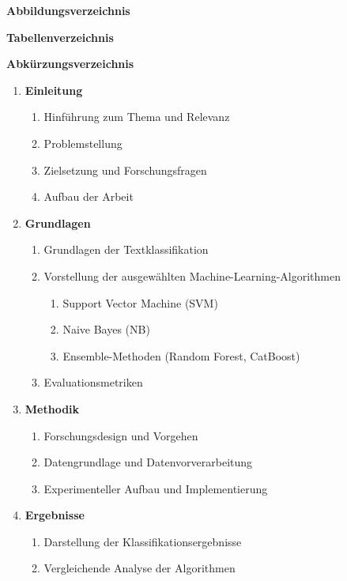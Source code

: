 \noindent\textbf{Abbildungsverzeichnis}
\par\noindent\textbf{Tabellenverzeichnis}
\par\noindent\textbf{Abkürzungsverzeichnis}
\begin{enumerate}[leftmargin=*, label=\arabic*, font=\bfseries, noitemsep]
	\item\textbf{Einleitung}
	      \begin{enumerate}[label=\theenumi.\arabic*, noitemsep]
		      \item Hinführung zum Thema und Relevanz
		      \item Problemstellung
		      \item Zielsetzung und Forschungsfragen
		      \item Aufbau der Arbeit
	      \end{enumerate}
	\item\textbf{Grundlagen}
	      \begin{enumerate}[label=\theenumi.\arabic*, noitemsep]
		      \item Grundlagen der Textklassifikation
		      \item Vorstellung der ausgewählten Machine-Learning-Algorithmen
		            \begin{enumerate}[label=\theenumii.\arabic*, noitemsep]
			            \item Support Vector Machine (SVM)
			            \item Naive Bayes (NB)
			            \item Ensemble-Methoden (Random Forest, CatBoost)
		            \end{enumerate}
		      \item Evaluationsmetriken
	      \end{enumerate}
	\item\textbf{Methodik}
	      \begin{enumerate}[label=\theenumi.\arabic*, noitemsep]
		      \item Forschungsdesign und Vorgehen
		      \item Datengrundlage und Datenvorverarbeitung
		      \item Experimenteller Aufbau und Implementierung
	      \end{enumerate}
	\item\textbf{Ergebnisse}
	      \begin{enumerate}[label=\theenumi.\arabic*, noitemsep]
		      \item Darstellung der Klassifikationsergebnisse
		      \item Vergleichende Analyse der Algorithmen

\end{enumerate}
\end{enumerate}
